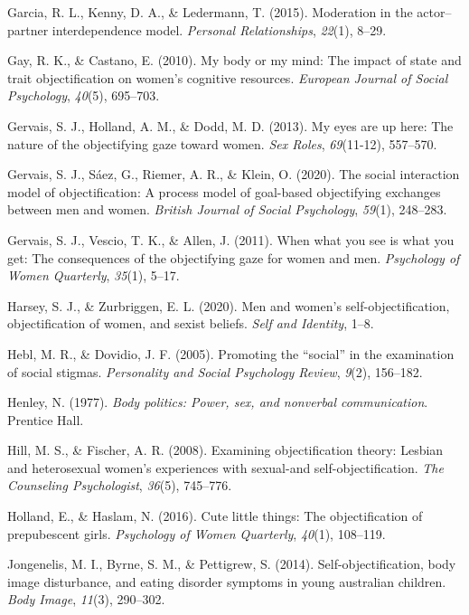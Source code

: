 \documentclass[man]{apa6}
\begin{document}
\hypertarget{ref-garcia2015moderation}{}
Garcia, R. L., Kenny, D. A., \& Ledermann, T. (2015). Moderation in the
actor--partner interdependence model. \emph{Personal Relationships},
\emph{22}(1), 8--29.

\hypertarget{ref-gay2010my}{}
Gay, R. K., \& Castano, E. (2010). My body or my mind: The impact of
state and trait objectification on women's cognitive resources.
\emph{European Journal of Social Psychology}, \emph{40}(5), 695--703.

\hypertarget{ref-gervais2013my}{}
Gervais, S. J., Holland, A. M., \& Dodd, M. D. (2013). My eyes are up
here: The nature of the objectifying gaze toward women. \emph{Sex
Roles}, \emph{69}(11-12), 557--570.

\hypertarget{ref-gervais2020social}{}
Gervais, S. J., Sáez, G., Riemer, A. R., \& Klein, O. (2020). The social
interaction model of objectification: A process model of goal-based
objectifying exchanges between men and women. \emph{British Journal of
Social Psychology}, \emph{59}(1), 248--283.

\hypertarget{ref-gervais2011you}{}
Gervais, S. J., Vescio, T. K., \& Allen, J. (2011). When what you see is
what you get: The consequences of the objectifying gaze for women and
men. \emph{Psychology of Women Quarterly}, \emph{35}(1), 5--17.

\hypertarget{ref-harsey2020men}{}
Harsey, S. J., \& Zurbriggen, E. L. (2020). Men and women's
self-objectification, objectification of women, and sexist beliefs.
\emph{Self and Identity}, 1--8.

\hypertarget{ref-hebl2005promoting}{}
Hebl, M. R., \& Dovidio, J. F. (2005). Promoting the ``social'' in the
examination of social stigmas. \emph{Personality and Social Psychology
Review}, \emph{9}(2), 156--182.

\hypertarget{ref-henley1977body}{}
Henley, N. (1977). \emph{Body politics: Power, sex, and nonverbal
communication}. Prentice Hall.

\hypertarget{ref-hill2008examining}{}
Hill, M. S., \& Fischer, A. R. (2008). Examining objectification theory:
Lesbian and heterosexual women's experiences with sexual-and
self-objectification. \emph{The Counseling Psychologist}, \emph{36}(5),
745--776.

\hypertarget{ref-holland2016}{}
Holland, E., \& Haslam, N. (2016). Cute little things: The
objectification of prepubescent girls. \emph{Psychology of Women
Quarterly}, \emph{40}(1), 108--119.

\hypertarget{ref-jongenelis2014}{}
Jongenelis, M. I., Byrne, S. M., \& Pettigrew, S. (2014).
Self-objectification, body image disturbance, and eating disorder
symptoms in young australian children. \emph{Body Image}, \emph{11}(3),
290--302.
\end{document}
